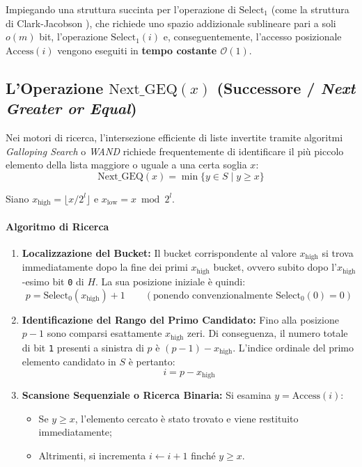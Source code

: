 \begin{property}
Impiegando una struttura succinta per l'operazione di $\text{Select}_1$ (come la struttura di Clark-Jacobson \cite{jacobson1989}), che richiede uno spazio addizionale sublineare pari a soli $o(m)$ bit, l'operazione $\text{Select}_1(i)$ e, conseguentemente, l'accesso posizionale $\text{Access}(i)$ vengono eseguiti in \textbf{tempo costante $\mathcal{O}(1)$}.
\end{property}

\FloatBarrier
\subsection{L'Operazione $\text{Next\_GEQ}(x)$ (Successore / \textit{Next Greater or Equal})}
\label{subsec:operazione-next-geq}

Nei motori di ricerca, l'intersezione efficiente di liste invertite tramite algoritmi \textit{Galloping Search} o \textit{WAND} richiede frequentemente di identificare il pi\`u piccolo elemento della lista maggiore o uguale a una certa soglia $x$:
\begin{equation}
  \text{Next\_GEQ}(x) = \min \{ y \in S \mid y \ge x \}
\end{equation}

Siano $x_{\text{high}} = \lfloor x / 2^l \rfloor$ e $x_{\text{low}} = x \bmod 2^l$.

\paragraph{Algoritmo di Ricerca}
\begin{enumerate}
  \item \textbf{Localizzazione del Bucket:} Il bucket corrispondente al valore $x_{\text{high}}$ si trova immediatamente dopo la fine dei primi $x_{\text{high}}$ bucket, ovvero subito dopo l'$x_{\text{high}}$-esimo bit \texttt{0} di $H$. La sua posizione iniziale \`e quindi:
  \begin{equation}
    p = \text{Select}_0(x_{\text{high}}) + 1 \qquad (\text{ponendo convenzionalmente } \text{Select}_0(0) = 0)
  \end{equation}
  \item \textbf{Identificazione del Rango del Primo Candidato:} Fino alla posizione $p - 1$ sono comparsi esattamente $x_{\text{high}}$ zeri. Di conseguenza, il numero totale di bit \texttt{1} presenti a sinistra di $p$ \`e $(p - 1) - x_{\text{high}}$. L'indice ordinale del primo elemento candidato in $S$ \`e pertanto:
  \begin{equation}
    i = p - x_{\text{high}}
  \end{equation}
  \item \textbf{Scansione Sequenziale o Ricerca Binaria:} Si esamina $y = \text{Access}(i)$:
  \begin{itemize}
    \item Se $y \ge x$, l'elemento cercato \`e stato trovato e viene restituito immediatamente;
    \item Altrimenti, si incrementa $i \leftarrow i + 1$ finch\'e $y \ge x$.
  \end{itemize}
\end{enumerate}

